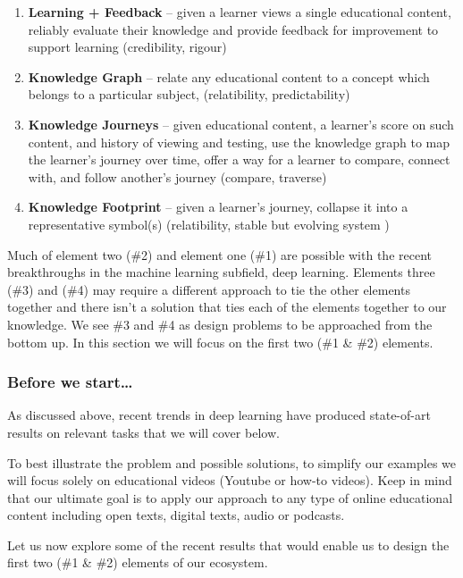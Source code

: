 \documentclass{acm_proc_article-sp}
\begin{document}
\begin{enumerate}
\def\labelenumi{\arabic{enumi}.}
\item
  \textbf{Learning + Feedback} -- given a learner views a single
  educational content, reliably evaluate their knowledge and provide
  feedback for improvement to support learning (credibility, rigour)
\item
  \textbf{Knowledge Graph} -- relate any educational content to a
  concept which belongs to a particular subject, (relatibility,
  predictability)
\item
  \textbf{Knowledge Journeys} -- given educational content, a learner's
  score on such content, and history of viewing and testing, use the
  knowledge graph to map the learner's journey over time, offer a way
  for a learner to compare, connect with, and follow another's journey
  (compare, traverse)
\item
  \textbf{Knowledge Footprint} -- given a learner's journey, collapse it
  into a representative symbol(s) (relatibility, stable but evolving
  system )
\end{enumerate}

Much of element two (\#2) and element one (\#1) are possible with the
recent breakthroughs in the machine learning subfield, deep learning.
Elements three (\#3) and (\#4) may require a different approach to tie
the other elements together and there isn't a solution that ties each of
the elements together to our knowledge. We see \#3 and \#4 as design
problems to be approached from the bottom up. In this section we will
focus on the first two (\#1 \& \#2) elements.

\subsubsection{Before we start\ldots{}}\label{before-we-start}

As discussed above, recent trends in deep learning have produced
state-of-art results on relevant tasks that we will cover below.

To best illustrate the problem and possible solutions, to simplify our
examples we will focus solely on educational videos (Youtube or how-to
videos). Keep in mind that our ultimate goal is to apply our approach to
any type of online educational content including open texts, digital
texts, audio or podcasts.

Let us now explore some of the recent results that would enable us to
design the first two (\#1 \& \#2) elements of our ecosystem.
\end{document}
